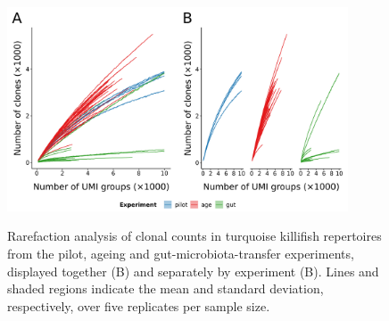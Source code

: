 \begin{figure}
\centering
\includegraphics[width = 0.9\textwidth]{_Figures/png/igseq-rarefied-clone-counts}
\begin{subfigure}{0em}
\label{fig:igseq-rarefied-clone-counts-all}
\end{subfigure}
\begin{subfigure}{0em}
\label{fig:igseq-rarefied-clone-counts-facets}
\end{subfigure}
\caption{Rarefaction analysis of clonal counts in turquoise killifish repertoires from the \igseq pilot, ageing and gut-microbiota-transfer experiments, displayed together (B) and separately by experiment (B). Lines and shaded regions indicate the mean and standard deviation, respectively, over five replicates per sample size.}
\label{fig:igseq-rarefied-clone-counts}
\end{figure}

